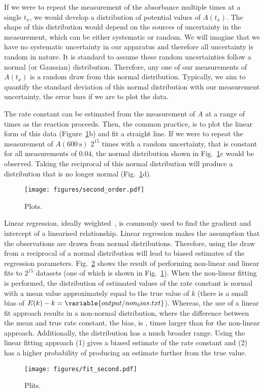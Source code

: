 \documentclass[reprint,superscriptaddress,nobibnotes,amsmath,amssymb]{revtex4-2}
\begin{document}
If we were to repeat the measurement of the absorbance multiple times at a single $t_x$, we would develop a distribution of potential values of $A(t_x)$.
The shape of this distribution would depend on the sources of uncertainty in the measurement, which can be either systematic or random. 
We will imagine that we have no systematic uncertainty in our apparatus and therefore all uncertainty is random in nature. 
It is standard to assume these random uncertainties follow a normal (or Gaussian) distribution. 
Therefore, any one of our measurements of $A(t_x)$ is a random draw from this normal distribution.
Typically, we aim to quantify the standard deviation of this normal distribution with our measurement uncertainty, the error bars if we are to plot the data. 

The rate constant can be estimated from the measurement of $A$ at a range of times as the reaction proceeds.
Then, the common practice, is to plot the linear form of this data (Figure~\ref{fig:second_order}b) and fit a straight line. 
If we were to repeat the measurement of $A(\SI{600}{\second})$ $2^{15}$ times with a random uncertainty, that is constant for all measurements of $0.04$, the normal distribution shown in Fig.~\ref{fig:second_order}c would be observed. 
Taking the reciprocal of this normal distribution will produce a distribution that is no longer normal (Fig.~\ref{fig:second_order}d). 
%
\begin{figure}
  \texttt{[image: figures/second\_order.pdf]}
  \caption{
    Plots.
    }
  \label{fig:second_order}
\end{figure}
%

Linear regression, ideally weighted~\cite{perrin_linear_2017}, is commonly used to find the gradient and intercept of a linearised relationship. 
Linear regression makes the assumption that the observations are drawn from normal distributions. 
Therefore, using the draw from a reciprocal of a normal distribution will lead to biased estimates of the regression parameters.
Fig.~\ref{fig:fit_second} shows the result of performing non-linear and linear fits to $2^15$ datasets (one of which is shown in Fig.~\ref{fig:second_order}). 
When the non-linear fitting is performed, the distribution of estimated values of the rate constant is normal with a mean value approximately equal to the true value of $k$ (there is a small bias of $E(k) - k = \variable{output/non_bias.txt}$).
Whereas, the use of a linear fit approach results in a non-normal distribution, where the difference between the mean and true rate constant, the bias, is ,  times larger than for the non-linear approach. 
Additionally, the distribution has a much broader range.
Using the linear fitting approach (1) gives a biased estimate of the rate constant and (2) has a higher probability of producing an estimate further from the true value. 
%
\begin{figure}
  \texttt{[image: figures/fit\_second.pdf]}
  \caption{
    Plits.
    }
  \label{fig:fit_second}
\end{figure}
\end{document}
